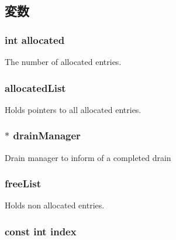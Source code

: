 \subsection{変数}
\hypertarget{classMSHRQueue_a115235fc25fdf1c03d856bd072b6cead}{
\subsubsection[{allocated}]{\setlength{\rightskip}{0pt plus 5cm}int {\bf allocated}}}
\label{classMSHRQueue_a115235fc25fdf1c03d856bd072b6cead}
The number of allocated entries. \hypertarget{classMSHRQueue_a4bac1d00b2059c983d4afaf4df82f4ac}{
\subsubsection[{allocatedList}]{ {\bf allocatedList}}}
\label{classMSHRQueue_a4bac1d00b2059c983d4afaf4df82f4ac}
Holds pointers to all allocated entries. \hypertarget{classMSHRQueue_a329b71fb934a93312ca0aacbf5a3f982}{
\subsubsection[{drainManager}]{$\ast$ {\bf drainManager}}}
\label{classMSHRQueue_a329b71fb934a93312ca0aacbf5a3f982}
Drain manager to inform of a completed drain \hypertarget{classMSHRQueue_abad3c0dea35aa5b18c234af72cd8ac89}{
\subsubsection[{freeList}]{ {\bf freeList}}}
\label{classMSHRQueue_abad3c0dea35aa5b18c234af72cd8ac89}
Holds non allocated entries. \hypertarget{classMSHRQueue_a32b76ccceab9e1bba3e8c4ef2947d1d8}{
\subsubsection[{index}]{\setlength{\rightskip}{0pt plus 5cm}const int {\bf index}}}
